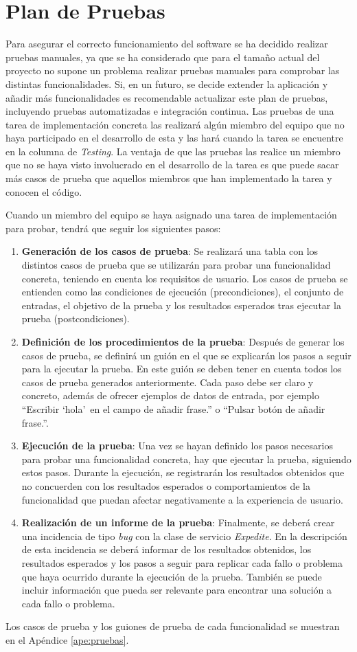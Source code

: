 \section{Plan de Pruebas}
\label{cap:pruebas}

Para asegurar el correcto funcionamiento del software se ha decidido realizar pruebas manuales, ya que se ha considerado que para el tamaño actual del proyecto no supone un problema realizar pruebas manuales para comprobar las distintas funcionalidades. Si, en un futuro, se decide extender la aplicación y añadir más funcionalidades es recomendable actualizar este plan de pruebas, incluyendo pruebas automatizadas e integración continua. Las pruebas de una tarea de implementación concreta las realizará algún miembro del equipo que no haya participado en el desarrollo de esta y las hará cuando la tarea se encuentre en la columna de \textit{Testing}. La ventaja de que las pruebas las realice un miembro que no se haya visto involucrado en el desarrollo de la tarea es que puede sacar más casos de prueba que aquellos miembros que han implementado la tarea y conocen el código.

Cuando un miembro del equipo se haya asignado una tarea de implementación para probar, tendrá que seguir los siguientes pasos:
\begin{enumerate}
    \item \textbf{Generación de los casos de prueba}: Se realizará una tabla con los distintos casos de prueba que se utilizarán para probar una funcionalidad concreta, teniendo en cuenta los requisitos de usuario. Los casos de prueba se entienden como las condiciones de ejecución (precondiciones), el conjunto de entradas, el objetivo de la prueba y los resultados esperados tras ejecutar la prueba (postcondiciones).
    \item \textbf{Definición de los procedimientos de la prueba}: Después de generar los casos de prueba, se definirá un guión en el que se explicarán los pasos a seguir para la ejecutar la prueba. En este guión se deben tener en cuenta todos los casos de prueba generados anteriormente. Cada paso debe ser claro y concreto, además de ofrecer ejemplos de datos de entrada, por ejemplo ``Escribir `hola'\, en el campo de añadir frase.'' o ``Pulsar botón de añadir frase.''.
    \item \textbf{Ejecución de la prueba}: Una vez se hayan definido los pasos necesarios para probar una funcionalidad concreta, hay que ejecutar la prueba, siguiendo estos pasos. Durante la ejecución, se registrarán los resultados obtenidos que no concuerden con los resultados esperados o comportamientos de la funcionalidad que puedan afectar negativamente a la experiencia de usuario.
    \item \textbf{Realización de un informe de la prueba}: Finalmente, se deberá crear una incidencia de tipo \textit{bug} con la clase de servicio \textit{Expedite}. En la descripción de esta incidencia se deberá informar de los resultados obtenidos, los resultados esperados y los pasos a seguir para replicar cada fallo o problema que haya ocurrido durante la ejecución de la prueba. También se puede incluir información que pueda ser relevante para encontrar una solución a cada fallo o problema.
\end{enumerate}

Los casos de prueba y los guiones de prueba de cada funcionalidad se muestran en el Apéndice \ref{ape:pruebas}.